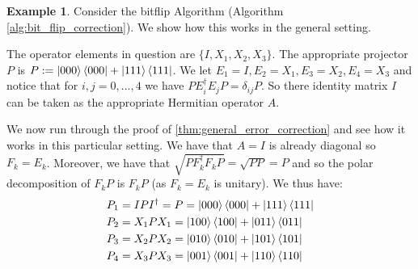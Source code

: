 \documentclass[12pt]{article}
\theoremstyle{plain}
\theoremstyle{definition}
\newtheorem{example}[thm]{Example}
\begin{document}
\begin{example}
	Consider the bitflip Algorithm (Algorithm \ref{alg:bit_flip_correction}). We show how this works in the general setting.
	
	The operator elements in question are $\lbrace I, X_1, X_2, X_3\rbrace$. The appropriate projector $P$ is $P := \ket{000}\bra{000} + \ket{111}\bra{111}$. We let $E_1 = I, E_2 = X_1, E_3 = X_2, E_4 = X_3$ and notice that for $i,j = 0,...,4$ we have $PE_i^\dagger E_j P = \delta_{ij}P$. So there identity matrix $I$ can be taken as the appropriate Hermitian operator $A$.
	
	We now run through the proof of \ref{thm:general_error_correction} and see how it works in this particular setting. We have that $A = I$ is already diagonal so $F_k = E_k$. Moreover, we have that $\sqrt{PF_k^\dagger F_k P} = \sqrt{PP} = P$ and so the polar decomposition of $F_k P$ is $F_kP$ (as $F_k = E_k$ is unitary). We thus have:
	\begin{align*}
		P_1 &= IPI^\dagger = P = \ket{000}\bra{000} + \ket{111}\bra{111}\\
		P_2 &= X_1 P X_1 = \ket{100}\bra{100} + \ket{011}\bra{011}\\
		P_3 &= X_2 P X_2 = \ket{010}\bra{010} + \ket{101}\bra{101}\\
		P_4 &= X_3 P X_3 = \ket{001}\bra{001} + \ket{110}\bra{110}\\
	\end{align*}
\end{example}
	
\end{document}
